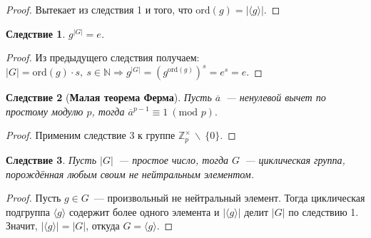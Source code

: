 \documentclass[a4paper, 14pt]{extarticle}
\newcommand{\integers}{\mathbb{Z}}
\newcommand{\naturals}{\mathbb{N}}
\newcommand{\ord}{\mathrm{ord}}
\renewcommand{\mod}{\mathrm{mod} \,}
\theoremstyle{definition}
\theoremstyle{plain}
\numberwithin{theorem}{section}
\numberwithin{definition}{section}
\numberwithin{statement}{section}
\numberwithin{lemma}{section}
\newtheorem{consequence}{Следствие}
\numberwithin{consequence}{section}
\begin{document}
	\begin{proof}
		Вытекает из следствия 1 и того, что $\ord(g) = |\langle g \rangle|$.
	\end{proof}
	\begin{consequence}
		$g^{|G|} = e$.
	\end{consequence}
	\begin{proof}
		Из предыдущего следствия получаем: ${|G| = \ord(g) \cdot s, \ s \in \naturals} \Longrightarrow g^{|G|} = (g^{\ord(g)})^s = e^s = e.$
	\end{proof}
	\begin{consequence}[\textbf{Малая теорема Ферма}]
		Пусть $\overline{a}$~--- ненулевой вычет по простому модулю $p$, тогда $\overline{a}^{p-1} \equiv 1 \ (\mod \, p).$
	\end{consequence}
	\begin{proof}
		Применим следствие 3 к группе $\integers_p ^ {\times} \, \backslash \ \{0\}.$ \qedhere
	\end{proof}
	\begin{consequence}
		Пусть $|G|$~--- простое число, тогда $G$~--- циклическая группа, порождённая любым своим не нейтральным элементом.
	\end{consequence}
	\begin{proof}
		Пусть $g \in G$~--- произвольный не нейтральный элемент. Тогда циклическая подгруппа $\langle g \rangle$ содержит более одного элемента и $|\langle g \rangle|$ делит $|G|$ по следствию 1. Значит, $|\langle g \rangle| = |G|$, откуда $G = \langle g \rangle$. 
	\end{proof}
	\newpage
\end{document}
